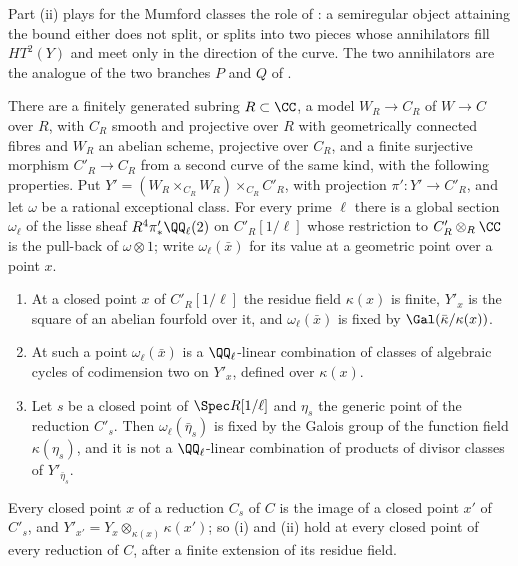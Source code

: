 Part (ii) plays for the Mumford classes the role of : a
semiregular object attaining the bound either does not split, or splits into
two pieces whose annihilators fill $HT^{2}(Y)$ and meet only in the direction
of the curve. The two annihilators are the analogue of the two branches $P$
and $Q$ of .

\begin{proposition}
\label{prop:modp}
There are a finitely generated subring $R\subset\CC$, a model $W_{R}\to
C_{R}$ of $W\to C$ over $R$, with $C_{R}$ smooth and projective over $R$ with
geometrically connected fibres and $W_{R}$ an abelian scheme, projective over
$C_{R}$, and a finite surjective morphism $C'_{R}\to C_{R}$ from a second curve of the same
kind, with the following properties. Put $Y'=(W_{R}\times_{C_{R}}W_{R})
\times_{C_{R}}C'_{R}$, with projection $\pi'\colon Y'\to C'_{R}$, and let
$\omega$ be a rational exceptional class. For every prime $\ell$ there is a
global section $\omega_{\ell}$ of the lisse sheaf
$R^{4}\pi'_{*}\QQ_{\ell}(2)$ on $C'_{R}[1/\ell]$ whose restriction to
$C'_{R}\otimes_{R}\CC$ is the pull-back of $\omega\otimes1$; write
$\omega_{\ell}(\bar{x})$ for its value at a geometric point over a point $x$.
\begin{enumerate}[label=\textup{(\roman*)},leftmargin=2.6em,itemsep=2pt]
\item At a closed point $x$ of $C'_{R}[1/\ell]$ the residue field
  $\kappa(x)$ is finite, $Y'_{x}$ is the square of an abelian fourfold over
  it, and $\omega_{\ell}(\bar{x})$ is fixed by $\Gal(\bar{\kappa}/\kappa(x))$.
\item At such a point $\omega_{\ell}(\bar{x})$ is a $\QQ_{\ell}$-linear
  combination of classes of algebraic cycles of codimension two on $Y'_{x}$,
  defined over $\kappa(x)$.
\item Let $s$ be a closed point of $\Spec R[1/\ell]$ and $\eta_{s}$ the generic
  point of the reduction $C'_{s}$. Then $\omega_{\ell}(\bar\eta_{s})$ is fixed
  by the Galois group of the function field $\kappa(\eta_{s})$, and it is not
  a $\QQ_{\ell}$-linear combination of products of divisor classes of
  $Y'_{\bar\eta_{s}}$.
\end{enumerate}
Every closed point $x$ of a reduction $C_{s}$ of $C$ is the image of a closed
point $x'$ of $C'_{s}$, and $Y'_{x'}=Y_{x}\otimes_{\kappa(x)}\kappa(x')$; so
(i) and (ii) hold at every closed point of every reduction of $C$, after a
finite extension of its residue field.
\end{proposition}

